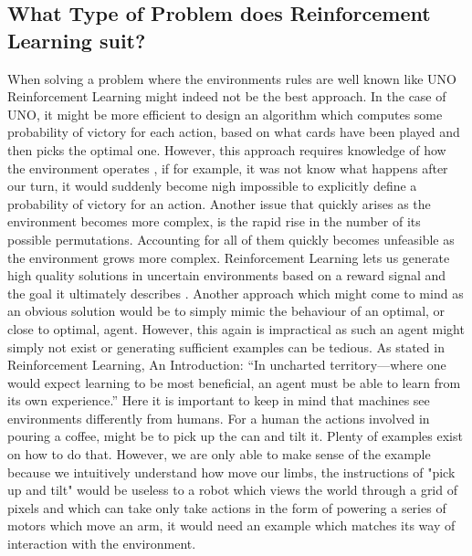 \subsection{What Type of Problem does Reinforcement Learning suit?}\label{subsec:Why_RL}
When solving a problem where the environments rules are well known like UNO Reinforcement Learning might indeed not be the best approach. In the case of UNO, it might be more efficient to design an algorithm which computes some probability of victory for each action, based on what cards have been played and then picks the optimal one. However, this approach requires knowledge of how the environment operates \cite[p. 8]{sutton_reinforcement_2018}, if for example, it was not know what happens after our turn, it would suddenly become nigh impossible to explicitly define a probability of victory for an action. Another issue that quickly arises as the environment becomes more complex, is the rapid rise in the number of its possible permutations. Accounting for all of them quickly becomes unfeasible as the environment grows more complex. Reinforcement Learning lets us generate high quality solutions in uncertain environments based on a reward signal and the goal it ultimately describes \cite[p. 03]{sutton_reinforcement_2018}. Another approach which might come to mind as an obvious solution would be to simply mimic the behaviour of an optimal, or close to optimal, agent. However, this again is impractical as such an agent might simply not exist or generating sufficient examples can be tedious. As stated in Reinforcement Learning, An Introduction: “In uncharted territory—where one would expect learning to be most beneficial, an agent must be able to learn from its own experience.” \cite[p. 02]{sutton_reinforcement_2018} Here it is important to keep in mind that machines see environments differently from humans. For a human the actions involved in pouring a coffee, might be to pick up the can and tilt it. Plenty of examples exist on how to do that. However, we are only able to make sense of the example because we intuitively understand how move our limbs, the instructions of "pick up and tilt" would be useless to a robot which views the world through a grid of pixels and which can take only take actions in the form of powering a series of motors which move an arm, it would need an example which matches its way of interaction with the environment.

